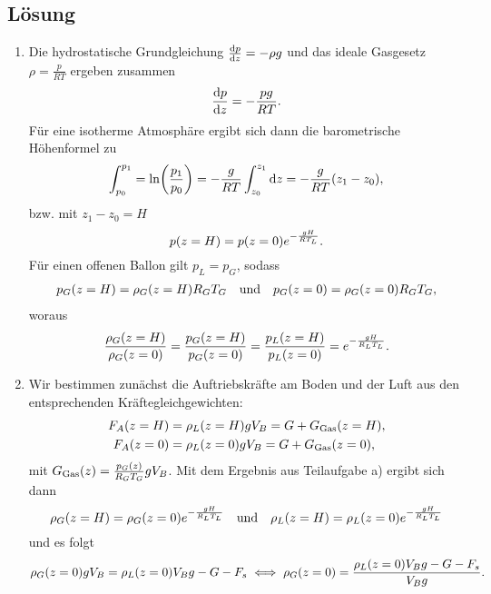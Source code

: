 \documentclass{exercise}
\begin{document}
    \subsection*{Lösung}
    \begin{enumerate}
        \item Die hydrostatische Grundgleichung \(\frac{\mathop{\mathrm{d}\!} p}{\mathop{\mathrm{d}\!} z} = -\rho g\) und das ideale Gasgesetz \(\rho = \frac{p}{RT}\) ergeben zusammen
        \[
            \frac{\mathop{\mathrm{d}\!} p}{\mathop{\mathrm{d}\!} z} = -\frac{pg}{RT}.
        \]
        Für eine isotherme Atmosphäre ergibt sich dann die barometrische Höhenformel zu
        \[
            \int_{p_0}^{p_1} = \ln\parentheses*{\frac{p_1}{p_0}} = -\frac{g}{RT}\int_{z_0}^{z_1}\d z = -\frac{g}{RT}\parentheses*{z_1 - z_0},
        \]
        bzw. mit \(z_1 - z_0 = H\)
        \[
            p\parentheses*{z = H} = p\parentheses*{z = 0}e^{-\frac{gH}{RT_L}}.
        \]
        Für einen offenen Ballon gilt \(p_L = p_G\), sodass
        \begin{align*}
            p_G\parentheses*{z = H} = \rho_G\parentheses*{z = H}R_G T_G \quad \text{und} \quad p_G\parentheses*{z = 0} = \rho_G\parentheses*{z = 0}R_G T_G,
        \end{align*}
        woraus
        \[
            \frac{\rho_G\parentheses*{z = H}}{\rho_G\parentheses*{z = 0}} = \frac{p_G\parentheses*{z = H}}{p_G\parentheses*{z = 0}} = \frac{p_L\parentheses*{z = H}}{p_L\parentheses*{z = 0}} = e^{-\frac{gH}{R_L T_L}}.
        \]
        \item Wir bestimmen zunächst die Auftriebskräfte am Boden und der Luft aus den entsprechenden Kräftegleichgewichten:
        \begin{align*}
            F_A\parentheses*{z = H} &= \rho_L\parentheses*{z = H}gV_B = G + G_{\text{Gas}}\parentheses*{z = H},\\
            F_A\parentheses*{z = 0} &= \rho_L\parentheses*{z = 0}gV_B = G + G_{\text{Gas}}\parentheses*{z = 0},
        \end{align*}
        mit \(G_{\text{Gas}}\parentheses*{z} = \frac{p_G\parentheses*{z}}{R_G T_G}gV_B\).
        Mit dem Ergebnis aus Teilaufgabe a) ergibt sich dann
        \[
            \rho_G\parentheses*{z = H} = \rho_G\parentheses*{z = 0}e^{-\frac{gH}{R_L T_L}} \quad \text{und} \quad \rho_L\parentheses*{z = H} = \rho_L\parentheses*{z = 0}e^{-\frac{gH}{R_L T_L}}
        \]
        und es folgt
        \[
            \rho_G\parentheses*{z = 0}gV_B = \rho_L\parentheses*{z = 0}V_Bg - G - F_s \iff \rho_G\parentheses*{z = 0} = \frac{\rho_L\parentheses*{z = 0}V_B g - G - F_s}{V_B g}.
\]
\end{enumerate}
\end{document}
